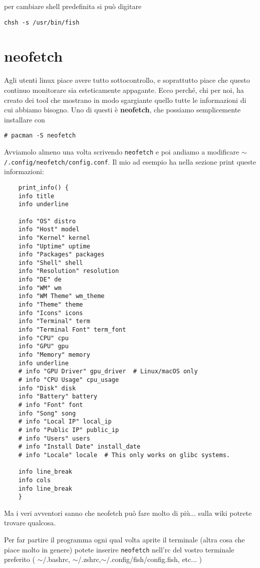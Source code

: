 \documentclass[twoside,italian]{book}
\newcommand{\code}[1]{\texttt{#1}}
\newcommand{\centcode}[1]{

\definecolor{codice}{rgb}{0.5,0.1,0.1}

	\begin{center}
		\color{codice}
		\code{#1}
	\end{center}


}
\begin{document}
			per cambiare shell predefinita si può digitare \centcode{chsh -s /usr/bin/fish}
		
		\section{neofetch}
			
			Agli utenti linux piace avere tutto sottocontrollo, e soprattutto piace che questo continuo monitorare sia esteticamente appagante. Ecco perché, chi per noi, ha creato dei tool che mostrano in modo sgargiante quello tutte le informazioni di cui abbiamo bisogno.
			Uno di questi è \textbf{neofetch}, che possiamo semplicemente installare con \centcode{\# pacman -S neofetch}Avviamolo almeno una volta scrivendo \code{neofetch} e poi andiamo a modificare  \code{$\sim$/.config/neofetch/config.conf}. Il mio ad esempio ha nella sezione print queste informazioni:\\
\begin{lstlisting}
	print_info() {
	info title
	info underline
	
	info "OS" distro
	info "Host" model
	info "Kernel" kernel
	info "Uptime" uptime
	info "Packages" packages
	info "Shell" shell
	info "Resolution" resolution
	info "DE" de
	info "WM" wm
	info "WM Theme" wm_theme
	info "Theme" theme
	info "Icons" icons
	info "Terminal" term
	info "Terminal Font" term_font
	info "CPU" cpu
	info "GPU" gpu
	info "Memory" memory
	info underline
	# info "GPU Driver" gpu_driver  # Linux/macOS only
	# info "CPU Usage" cpu_usage
	info "Disk" disk
	info "Battery" battery
	# info "Font" font
	info "Song" song
	# info "Local IP" local_ip
	# info "Public IP" public_ip
	# info "Users" users
	# info "Install Date" install_date
	# info "Locale" locale  # This only works on glibc systems.
	
	info line_break
	info cols
	info line_break
	}
\end{lstlisting}
			Ma i veri avventori sanno che neofetch può fare molto di più... sulla wiki potrete trovare qualcosa.
			
			Per far partire il programma ogni qual volta aprite il terminale (altra cosa che piace molto in genere) potete inserire \code{neofetch} nell'rc del vostro terminale preferito ( $\sim$/.bashrc, $\sim$/.zshrc,$\sim$/.config/fish/config.fish, etc... )
			
\end{document}
